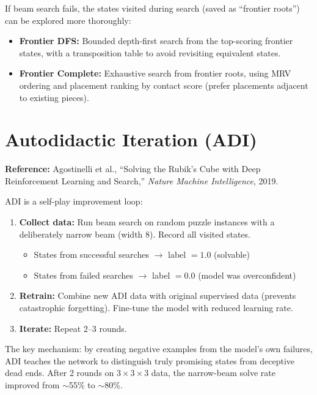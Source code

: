 \documentclass[11pt]{article}
\begin{document}
If beam search fails, the states visited during search (saved as ``frontier roots'') can be explored more thoroughly:
\begin{itemize}[nosep]
  \item \textbf{Frontier DFS:} Bounded depth-first search from the top-scoring frontier states, with a transposition table to avoid revisiting equivalent states.
  \item \textbf{Frontier Complete:} Exhaustive search from frontier roots, using MRV ordering and placement ranking by contact score (prefer placements adjacent to existing pieces).
\end{itemize}

\section{Autodidactic Iteration (ADI)}

\textbf{Reference:} Agostinelli et al., ``Solving the Rubik's Cube with Deep Reinforcement Learning and Search,'' \textit{Nature Machine Intelligence}, 2019.

ADI is a self-play improvement loop:

\begin{enumerate}[nosep]
  \item \textbf{Collect data:} Run beam search on random puzzle instances with a deliberately narrow beam (width 8). Record all visited states.
  \begin{itemize}[nosep]
    \item States from successful searches $\to$ label $= 1.0$ (solvable)
    \item States from failed searches $\to$ label $= 0.0$ (model was overconfident)
  \end{itemize}
  \item \textbf{Retrain:} Combine new ADI data with original supervised data (prevents catastrophic forgetting). Fine-tune the model with reduced learning rate.
  \item \textbf{Iterate:} Repeat 2--3 rounds.
\end{enumerate}

The key mechanism: by creating negative examples from the model's own failures, ADI teaches the network to distinguish truly promising states from deceptive dead ends. After 2 rounds on $3 \times 3 \times 3$ data, the narrow-beam solve rate improved from $\sim$55\% to $\sim$80\%.
\end{document}
